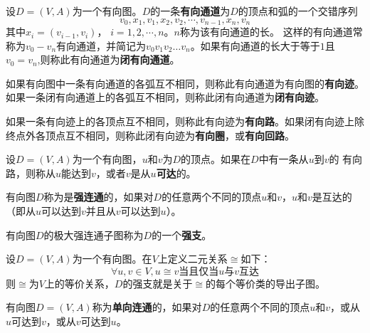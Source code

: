 \documentclass{beamer}
\begin{document}
\begin{CJK*}{UTF8}{gbsn}
\begin{frame}
\end{frame}
\begin{frame}
    \begin{Def}
    设$D=(V,A)$为一个有向图。$D$的一条{\bfseries 有向通道}为$D$的顶点和弧的一个交错序列
    \[v_0,x_1,v_1,x_2,v_2,\cdots,v_{n-1},x_n,v_n \]
    其中$x_i = (v_{i-1},v_i)$， $i=1,2,\cdots, n$。$n$称为该有向通道的长。 这样的有向通道常称为$v_0-v_n$有向通道，并简记为$v_0v_1v_2\ldots v_n$。如果有向通道的长大于等于$1$且$v_0=v_n$,则称此有向通道为{\bfseries 闭有向通道}。
  \end{Def}
    \begin{Def}
如果有向图中一条有向通道的各弧互不相同，则称此有向通道为有向图的{\bfseries 有向迹}。如果一条闭有向通道上的各弧互不相同，则称此闭有向通道为{\bfseries 闭有向迹}。   
  \end{Def}
  \begin{Def}
如果一条有向迹上的各顶点互不相同，则称此有向迹为{\bfseries 有向路}。如果闭有向迹上除终点外各顶点互不相同，则称此闭有向迹为{\bfseries 有向圈}，或{\bfseries 有向回路}。
  \end{Def}
\end{frame}
\begin{frame}
     \begin{Def}
    设$D=(V,A)$为一个有向图，$u$和$v$为$D$的顶点。如果在$D$中有一条从$u$到$v$的
    有向路，则称从$u$能达到$v$，或者$v$是从$u${\bfseries 可达}的。
  \end{Def}
  \begin{Def}
   有向图$D$称为是{\bfseries 强连通}的，如果对$D$的任意两个不同的顶点$u$和$v$，$u$和$v$是互达的（即从$u$可以达到$v$并且从$v$可以达到$u$）。 
  \end{Def}
\end{frame}
\begin{frame}
     \begin{Def}
   有向图$D$的极大强连通子图称为$D$的一个{\bfseries 强支}。 
 \end{Def}
      \begin{Thm}
      设$D=(V,A)$为一个有向图。在$V$上定义二元关系$\cong$如下：\[\forall u, v \in V, u \cong v\text{当且仅当}u\text{与}v\text{互达}\]则$\cong$为$V$上的等价关系，$D$的强支就是关于$\cong$的每个等价类的导出子图。
    \end{Thm}
       \begin{Def}
   有向图$D=(V,A)$称为{\bfseries 单向连通}的，如果对$D$的任意两个不同的顶点$u$和$v$，或从$u$可达到$v$，或从$v$可达到$u$。 
 \end{Def}
    \begin{Def}

\end{Def}
\end{frame}
\end{CJK*}
\end{document}
